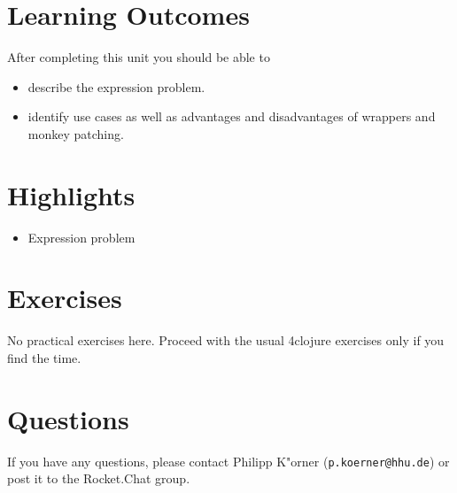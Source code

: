 \documentclass[11pt,a4paper]{article}
\begin{document}
\section{Learning Outcomes}

After completing this unit you should be able to

\begin{itemize}
    \item describe the expression problem.
    \item identify use cases as well as advantages and disadvantages of wrappers and monkey patching.
\end{itemize}

\section{Highlights}

\begin{itemize}
    \item Expression problem
\end{itemize}



\section{Exercises}

No practical exercises here.
Proceed with the usual 4clojure exercises
only if you find the time.


%
%


	\section*{Questions}
	If you have any questions, please contact Philipp K"orner (\texttt{p.koerner@hhu.de}) or post it to the Rocket.Chat group.
\end{document}
